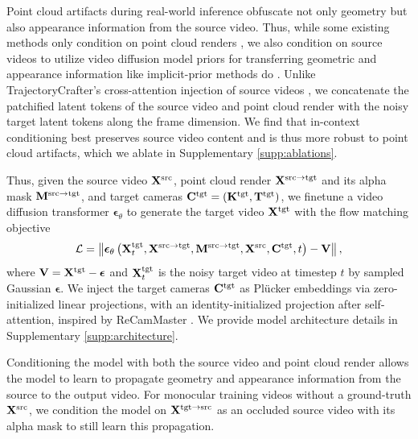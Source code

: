 Point cloud artifacts during real-world inference obfuscate not only geometry but also appearance information from the source video. Thus, while some existing methods only condition on point cloud renders \cite{ren2025gen3c, hu2025ex4d}, we also condition on source videos to utilize video diffusion model priors for transferring geometric and appearance information like implicit-prior methods do \cite{bai2025recammaster, luo2025camclonemaster}. Unlike TrajectoryCrafter's cross-attention injection of source videos \cite{yu2025trajcraft}, we concatenate the patchified latent tokens of the source video and point cloud render with the noisy target latent tokens along the frame dimension. We find that in-context conditioning best preserves source video content and is thus more robust to point cloud artifacts, which we ablate in Supplementary \ref{supp:ablations}.

Thus, given the source video $\mathbf{X}^{\mathrm{src}}$, point cloud render $\mathbf{X}^{\mathrm{src \to tgt}}$ and its alpha mask $\mathbf{M}^{\mathrm{src \to tgt}}$, and target cameras $\mathbf{C}^{\mathrm{tgt}} = \left( \mathbf{K}^{\mathrm{tgt}}, \mathbf{T}^{\mathrm{tgt}} \right)$, we finetune a video diffusion transformer $\boldsymbol{\epsilon}_\theta$ to generate the target video $\mathbf{X}^{\mathrm{tgt}}$ with the flow matching objective
\begin{equation}
    \mathcal{L} = \left\lVert \boldsymbol{\epsilon}_\theta \left( \mathbf{X}^{\mathrm{tgt}}_t, \mathbf{X}^{\mathrm{src \to tgt}}, \mathbf{M}^{\mathrm{src \to tgt}}, \mathbf{X}^{\mathrm{src}}, \mathbf{C}^{\mathrm{tgt}}, t \right) - \mathbf{V} \right\rVert ,
\end{equation}
where $\mathbf{V} = \mathbf{X}^{\mathrm{tgt}} - \boldsymbol{\epsilon}$ and $\mathbf{X}^{\mathrm{tgt}}_t$ is the noisy target video at timestep $t$ by sampled Gaussian $\boldsymbol{\epsilon}$. We inject the target cameras $\mathbf{C}^{\mathrm{tgt}}$ as Pl\"{u}cker embeddings \cite{kuang2024collaborative, he2025cameractrl, xu2025virtuallybeing} via zero-initialized linear projections, with an identity-initialized projection after self-attention, inspired by ReCamMaster \cite{bai2025recammaster}. We provide model architecture details in Supplementary \ref{supp:architecture}.

Conditioning the model with both the source video and point cloud render allows the model to learn to propagate geometry and appearance information from the source to the output video. For monocular training videos without a ground-truth $\mathbf{X}^{\mathrm{src}}$, we condition the model on $\mathbf{X}^{\mathrm{tgt \to src}}$ as an occluded source video with its alpha mask to still learn this propagation.




